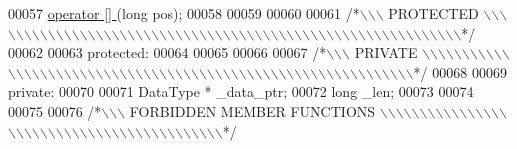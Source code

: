 \begin{DoxyCode}
00057                         \hyperlink{a00007_a502aab733f04c8fed33348bce9f49e92}{operator [] }(\textcolor{keywordtype}{long} pos);
00058 
00059 
00060 
00061 \textcolor{comment}{/*\(\backslash\)\(\backslash\)\(\backslash\) PROTECTED \(\backslash\)\(\backslash\)\(\backslash\)\(\backslash\)\(\backslash\)\(\backslash\)\(\backslash\)\(\backslash\)\(\backslash\)\(\backslash\)\(\backslash\)\(\backslash\)\(\backslash\)\(\backslash\)\(\backslash\)\(\backslash\)\(\backslash\)\(\backslash\)\(\backslash\)\(\backslash\)\(\backslash\)\(\backslash\)\(\backslash\)\(\backslash\)\(\backslash\)\(\backslash\)\(\backslash\)\(\backslash\)\(\backslash\)\(\backslash\)\(\backslash\)\(\backslash\)\(\backslash\)\(\backslash\)\(\backslash\)\(\backslash\)\(\backslash\)\(\backslash\)\(\backslash\)\(\backslash\)\(\backslash\)\(\backslash\)\(\backslash\)\(\backslash\)\(\backslash\)\(\backslash\)\(\backslash\)\(\backslash\)\(\backslash\)\(\backslash\)\(\backslash\)\(\backslash\)\(\backslash\)\(\backslash\)\(\backslash\)\(\backslash\)\(\backslash\)\(\backslash\)\(\backslash\)\(\backslash\)*/}
00062 
00063 \textcolor{keyword}{protected}:
00064 
00065 
00066 
00067 \textcolor{comment}{/*\(\backslash\)\(\backslash\)\(\backslash\) PRIVATE \(\backslash\)\(\backslash\)\(\backslash\)\(\backslash\)\(\backslash\)\(\backslash\)\(\backslash\)\(\backslash\)\(\backslash\)\(\backslash\)\(\backslash\)\(\backslash\)\(\backslash\)\(\backslash\)\(\backslash\)\(\backslash\)\(\backslash\)\(\backslash\)\(\backslash\)\(\backslash\)\(\backslash\)\(\backslash\)\(\backslash\)\(\backslash\)\(\backslash\)\(\backslash\)\(\backslash\)\(\backslash\)\(\backslash\)\(\backslash\)\(\backslash\)\(\backslash\)\(\backslash\)\(\backslash\)\(\backslash\)\(\backslash\)\(\backslash\)\(\backslash\)\(\backslash\)\(\backslash\)\(\backslash\)\(\backslash\)\(\backslash\)\(\backslash\)\(\backslash\)\(\backslash\)\(\backslash\)\(\backslash\)\(\backslash\)\(\backslash\)\(\backslash\)\(\backslash\)\(\backslash\)\(\backslash\)\(\backslash\)\(\backslash\)\(\backslash\)\(\backslash\)\(\backslash\)\(\backslash\)\(\backslash\)\(\backslash\)*/}
00068 
00069 \textcolor{keyword}{private}:
00070 
00071     DataType *      \_data\_ptr;
00072     \textcolor{keywordtype}{long}                \_len;
00073 
00074 
00075 
00076 \textcolor{comment}{/*\(\backslash\)\(\backslash\)\(\backslash\) FORBIDDEN MEMBER FUNCTIONS \(\backslash\)\(\backslash\)\(\backslash\)\(\backslash\)\(\backslash\)\(\backslash\)\(\backslash\)\(\backslash\)\(\backslash\)\(\backslash\)\(\backslash\)\(\backslash\)\(\backslash\)\(\backslash\)\(\backslash\)\(\backslash\)\(\backslash\)\(\backslash\)\(\backslash\)\(\backslash\)\(\backslash\)\(\backslash\)\(\backslash\)\(\backslash\)\(\backslash\)\(\backslash\)\(\backslash\)\(\backslash\)\(\backslash\)\(\backslash\)\(\backslash\)\(\backslash\)\(\backslash\)\(\backslash\)\(\backslash\)\(\backslash\)\(\backslash\)\(\backslash\)\(\backslash\)\(\backslash\)\(\backslash\)\(\backslash\)\(\backslash\)*/}

\end{DoxyCode}

